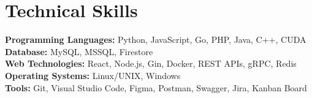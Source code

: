 \documentclass[letterpaper,11pt]{article}
\begin{document}
\section{Technical Skills}
 \begin{itemize}[leftmargin=0.15in, label={}]
    \small{\item{
     \textbf{Programming Languages:} Python, JavaScript, Go, PHP, Java, C++, CUDA \\
     \textbf{Database:} MySQL, MSSQL, Firestore \\
     \textbf{Web Technologies:} React, Node.js, Gin, Docker, REST APIs, gRPC, Redis \\
     \textbf{Operating Systems:} Linux/UNIX, Windows \\
     \textbf{Tools:} Git, Visual Studio Code, Figma, Postman, Swagger, Jira, Kanban Board
    }}
 \end{itemize}


\end{document}
